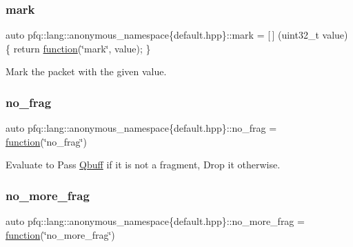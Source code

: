 \subsubsection{\texorpdfstring{mark}{mark}}
{\footnotesize\ttfamily auto pfq\+::lang\+::anonymous\+\_\+namespace\{default.\+hpp\}\+::mark = \mbox{[}$\,$\mbox{]} (uint32\+\_\+t value) \{ return \hyperlink{namespacepfq_1_1lang_a1a4638059d700ae08d0ca63886ff2bb3}{function}(\char`\"{}mark\char`\"{}, value); \}}



Mark the packet with the given value. 

\mbox{\label{namespacepfq_1_1lang_1_1anonymous__namespace_02default_8hpp_03_a4cfaf018f687a1563161b8f4245a6652}} 
\subsubsection{\texorpdfstring{no\+\_\+frag}{no\_frag}}
{\footnotesize\ttfamily auto pfq\+::lang\+::anonymous\+\_\+namespace\{default.\+hpp\}\+::no\+\_\+frag = \hyperlink{namespacepfq_1_1lang_a1a4638059d700ae08d0ca63886ff2bb3}{function}(\char`\"{}no\+\_\+frag\char`\"{})}



Evaluate to {\ttfamily Pass} \hyperlink{structpfq_1_1lang_1_1Qbuff}{Qbuff} if it is not a fragment, {\ttfamily Drop} it otherwise. 

\mbox{\label{namespacepfq_1_1lang_1_1anonymous__namespace_02default_8hpp_03_a88628ce70e2a650af1338851373b9891}} 
\subsubsection{\texorpdfstring{no\+\_\+more\+\_\+frag}{no\_more\_frag}}
{\footnotesize\ttfamily auto pfq\+::lang\+::anonymous\+\_\+namespace\{default.\+hpp\}\+::no\+\_\+more\+\_\+frag = \hyperlink{namespacepfq_1_1lang_a1a4638059d700ae08d0ca63886ff2bb3}{function}(\char`\"{}no\+\_\+more\+\_\+frag\char`\"{})}




